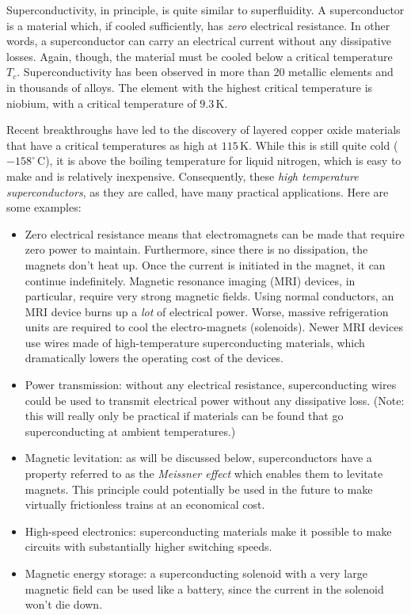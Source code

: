 Superconductivity, in principle, is quite similar to superfluidity.
A superconductor is a material which, if cooled sufficiently, has {\em
zero} electrical resistance.  In other words, a superconductor can
carry an electrical current without any dissipative losses.  Again,
though, the material must be cooled below a critical temperature $T_c$.
Superconductivity has been observed in more than 20 metallic elements
and in thousands of alloys.  The element with the highest critical
temperature is niobium, with a critical temperature of $9.3\, \mbox{K}$.

Recent breakthroughs have led to the discovery of layered copper
oxide materials that have a critical temperatures as high at
$115\,\mbox{K}$.  While this is still quite cold ($-158^\circ\, \mbox{C}$),
it is
above the boiling temperature for liquid nitrogen, which is easy to
make and is relatively inexpensive. Consequently, these {\em high
  temperature superconductors}, as they are called, have many
practical applications.  Here are some examples:
\begin{itemize}
\item Zero electrical resistance means that electromagnets can be made
  that require zero power to maintain.  Furthermore, since there is no
  dissipation, the magnets don't heat up.  Once the current is
  initiated in the magnet, it can continue indefinitely.  Magnetic
  resonance imaging (MRI) devices, in particular, require very strong
  magnetic fields.  Using normal conductors, an MRI device burns up a
  {\em lot} of electrical power.  Worse, massive refrigeration units
  are required to cool the electro-magnets (solenoids).  Newer MRI
  devices use wires made of high-temperature superconducting materials,
  which dramatically lowers the operating cost of the devices.
\item Power transmission: without any electrical resistance,
  superconducting wires could be used to transmit electrical power
  without any dissipative loss.  (Note: this will really only be
  practical if materials can be found that go superconducting at ambient
  temperatures.)
\item Magnetic levitation: as will be discussed below, superconductors
  have a property referred to as the {\em Meissner effect} which
  enables them to levitate magnets.  This principle could potentially
  be used in the future to make virtually frictionless trains at an
  economical cost.
\item High-speed electronics: superconducting materials make it
  possible to make circuits with substantially higher switching
  speeds.
\item Magnetic energy storage: a superconducting solenoid with a very
  large magnetic field can be used like a battery, since the current
  in the solenoid won't die down.
\end{itemize}

